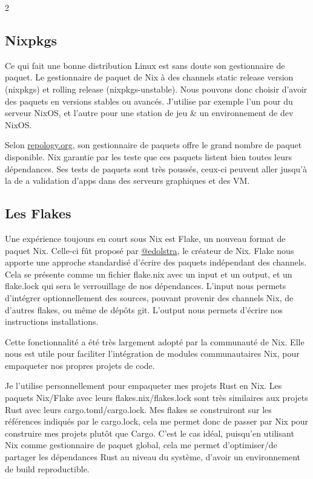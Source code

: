 \documentclass[a4paper,11pt]{article}
\begin{document}
\begin{blogmain}
\begin{multicols}{2}
\subsection{Nixpkgs}
Ce qui fait une bonne distribution Linux est sans doute son gestionnaire de paquet.
Le gestionnaire de paquet de Nix à des channels static release version (nixpkgs) et rolling release (nixpkgs-unstable).
Nous pouvons donc choisir d'avoir des paquets en versions stables ou avancés.
J'utilise par exemple l'un pour du serveur NixOS, et l'autre pour une station de jeu \& un environnement de dev NixOS.

Selon \href{https://repology.org/repositories/statistics/total}{repology.org}, son gestionnaire de paquets offre le grand nombre de paquet disponible.
Nix garantie par les teste que ces paquets listent bien toutes leurs dépendances.
Ses tests de paquets sont très poussés, ceux-ci peuvent aller jusqu'à la de a validation d'apps dans des serveurs graphiques et des VM.

\subsection{Les Flakes}
Une expérience toujours en court sous Nix est Flake, un nouveau format de paquet Nix.
Celle-ci fût proposé par \href{https://edolstra.github.io}{@edolstra}, le créateur de Nix.
Flake nous apporte une approche standardisé d'écrire des paquets indépendant des channels.
Cela se présente comme un fichier flake.nix avec un input et un output, et un flake.lock qui sera le verrouillage de nos dépendances.
L'input nous permets d'intégrer optionnellement des sources, pouvant provenir des channels Nix, de d'autres flakes, ou même de dépôts git.
L'output nous permets d'écrire nos instructions installations. 

Cette fonctionnalité a été très largement adopté par la communauté de Nix.
Elle nous est utile pour faciliter l'intégration de modules communautaires Nix, pour empaqueter nos propres projets de code.


Je l'utilise personnellement pour empaqueter mes projets Rust en Nix.
Les paquets Nix/Flake avec leurs flakes.nix/flakes.lock sont très similaires aux projets Rust avec leurs cargo.toml/cargo.lock.
Mes flakes se construiront sur les références indiqués par le cargo.lock, cela me permet donc de passer par Nix pour construire mes projets plutôt que Cargo.
C'est le cas idéal, puisqu'en utilisant Nix comme gestionnaire de paquet global, cela me permet d'optimiser/de partager les dépendances Rust au niveau du système, d'avoir un environnement de build reproductible.


\end{multicols}
\end{blogmain}
\end{document}
